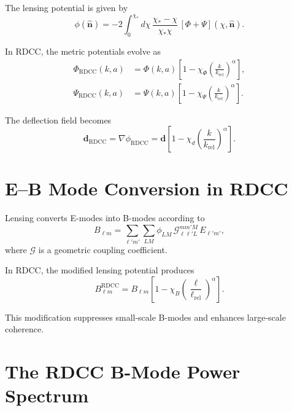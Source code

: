 \documentclass[11pt,a4paper]{article}
\begin{document}
The lensing potential is given by
\begin{equation}
    \phi(\hat{\mathbf{n}})
    = -2 \int_{0}^{\chi_{*}}
      d\chi\,
      \frac{\chi_{*} - \chi}{\chi_{*}\chi}\,
      \left[\Phi + \Psi\right](\chi,\hat{\mathbf{n}}).
\end{equation}

In RDCC, the metric potentials evolve as
\begin{align}
    \Phi_{\mathrm{RDCC}}(k,a)
    &= \Phi(k,a)
       \left[
         1 - \chi_{\Phi}
         \left(\frac{k}{k_{\mathrm{rel}}}\right)^{\alpha}
       \right], \\
    \Psi_{\mathrm{RDCC}}(k,a)
    &= \Psi(k,a)
       \left[
         1 - \chi_{\Psi}
         \left(\frac{k}{k_{\mathrm{rel}}}\right)^{\alpha}
       \right].
\end{align}

The deflection field becomes
\begin{equation}
    \mathbf{d}_{\mathrm{RDCC}}
    = \nabla \phi_{\mathrm{RDCC}}
    = \mathbf{d}
      \left[
        1 - \chi_{d}
        \left(\frac{k}{k_{\mathrm{rel}}}\right)^{\alpha}
      \right].
\end{equation}
\section{E--B Mode Conversion in RDCC}

Lensing converts E-modes into B-modes according to
\begin{equation}
    B_{\ell m}
    = \sum_{\ell' m'}
      \sum_{LM}
      \phi_{LM}\,
      \mathcal{G}_{\ell \ell' L}^{m m' M}\,
      E_{\ell' m'},
\end{equation}
where $\mathcal{G}$ is a geometric coupling coefficient.

In RDCC, the modified lensing potential produces
\begin{equation}
    B_{\ell m}^{\mathrm{RDCC}}
    = B_{\ell m}
      \left[
        1 - \chi_{B}
        \left(\frac{\ell}{\ell_{\mathrm{rel}}}\right)^{\alpha}
      \right].
\end{equation}

This modification suppresses small-scale B-modes and enhances large-scale 
coherence.
\section{The RDCC B-Mode Power Spectrum}
\end{document}
